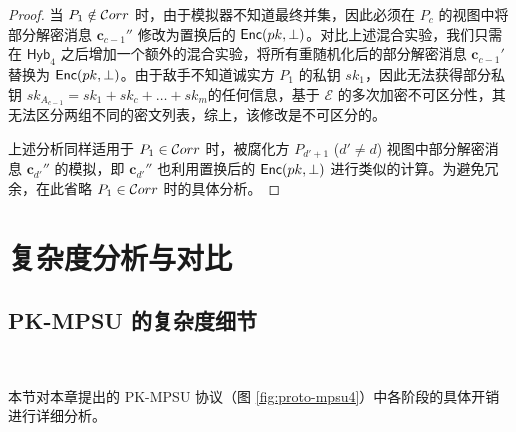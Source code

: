 \begin{proof}
当 $P_1 \notin \mathcal{C}orr$ 时，由于模拟器不知道最终并集，因此必须在 $P_{c}$ 的视图中将部分解密消息 $\textbf{c}_{c-1}''$ 修改为置换后的 $\mathsf{Enc}(pk, \perp)$。对比上述混合实验，我们只需在 $\mathsf{Hyb}_{4}$ 之后增加一个额外的混合实验，将所有重随机化后的部分解密消息 $\textbf{c}_{c-1}'$ 替换为 $\mathsf{Enc}(pk,\perp)$。由于敌手不知道诚实方 $P_1$ 的私钥 $sk_1$，因此无法获得部分私钥 $sk_{A_{c-1}} = sk_1 + sk_c + \dots + sk_m$的任何信息，基于 $\mathcal{E}$ 的多次加密不可区分性，其无法区分两组不同的密文列表，综上，该修改是不可区分的。

上述分析同样适用于 $P_1 \in \mathcal{C}orr$ 时，被腐化方 $P_{d'+1}$ ($d' \ne d$) 视图中部分解密消息 $\textbf{c}_{d'}''$ 的模拟，即 $\textbf{c}_{d'}''$ 也利用置换后的 $\mathsf{Enc}(pk,\perp)$ 进行类似的计算。为避免冗余，在此省略 $P_1 \in \mathcal{C}orr$ 时的具体分析。
\end{proof}

\section{复杂度分析与对比}

\subsection{PK-MPSU 的复杂度细节}~\label{sec:analysis-pke}

本节对本章提出的 PK-MPSU 协议（图 \ref{fig:proto-mpsu4}）中各阶段的具体开销进行详细分析。

